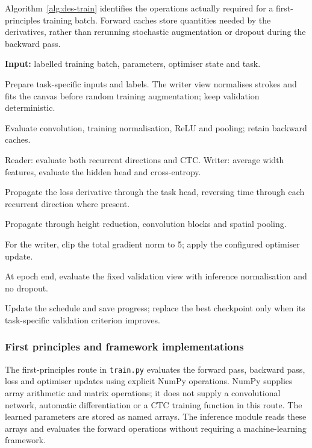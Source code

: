 Algorithm~\ref{alg:des-train} identifies the operations actually required for a first-principles training batch. Forward caches store quantities needed by the derivatives, rather than rerunning stochastic augmentation or dropout during the backward pass.
\begin{designalgorithm}
\caption{One numerical training batch and validation checkpoint decision}
\label{alg:des-train}
\textbf{Input:} labelled training batch, parameters, optimiser state and task.
\begin{designsteps}
\item Prepare task-specific inputs and labels. The writer view normalises strokes and fits the canvas before random training augmentation; keep validation deterministic.
\item Evaluate convolution, training normalisation, ReLU and pooling; retain backward caches.
\item Reader: evaluate both recurrent directions and CTC. Writer: average width features, evaluate the hidden head and cross-entropy.
\item Propagate the loss derivative through the task head, reversing time through each recurrent direction where present.
\item Propagate through height reduction, convolution blocks and spatial pooling.
\item For the writer, clip the total gradient norm to 5; apply the configured optimiser update.
\item At epoch end, evaluate the fixed validation view with inference normalisation and no dropout.
\item Update the schedule and save progress; replace the best checkpoint only when its task-specific validation criterion improves.
\end{designsteps}
\end{designalgorithm}

\subsubsection{First principles and framework implementations}
\label{sec:des-implementations}
The first-principles route in \texttt{train.py} evaluates the forward pass, backward pass, loss and optimiser updates using explicit NumPy operations. NumPy supplies array arithmetic and matrix operations; it does not supply a convolutional network, automatic differentiation or a CTC training function in this route. The learned parameters are stored as named arrays. The inference module reads these arrays and evaluates the forward operations without requiring a machine-learning framework.

